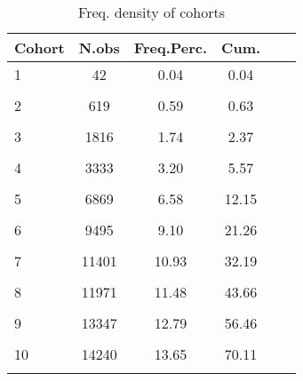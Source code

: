 
\begin{table}\centering
    \def\sym#1{\ifmmode^{#1}\else\(^{#1}\)\fi}
    \caption{Freq. density of cohorts\label{Tab:desc-cohort}}
    
    \begin{tabular}{l*{5}{c}}
    
    \hline
                \multicolumn{1}{c}{Cohort} & \multicolumn{1}{c}{N.obs} &  \multicolumn{1}{c}{Freq.Perc.} & \multicolumn{1}{c}{Cum.}\\
    \hline
    1           &          42         & 0.04      &  0.04\\
                &                     \\
    
    2           &         619    &0.59     &   0.63       \\
                &                     \\
    
    3           &        1816    & 1.74     &   2.37    \\
                &                     \\
    
    4           &        3333   & 3.20   &     5.57     \\
                &                     \\
    
    5           &        6869    &6.58     &  12.15     \\
                &                     \\
    
    6           &        9495    &9.10   &    21.26     \\
                &                     \\
    
    7           &       11401     &10.93   &    32.19    \\
                &                     \\
    
    8           &       11971    &11.48      & 43.66     \\
                &                     \\
    
    9           &       13347    &12.79     &  56.46     \\
                &                     \\
    
    10          &       14240    & 13.65  &     70.11    \\
                &                     \\
    

\end{tabular}
\end{table}
